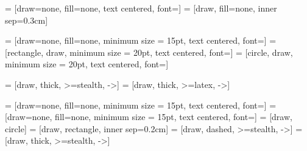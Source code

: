  = [draw=none, fill=none, text centered, font=\normalsize]
 = [draw, fill=none, inner sep=0.3cm]


 = [draw=none, fill=none, minimum size = 15pt, text centered, font=\normalsize]
 = [rectangle, draw, minimum size = 20pt, text centered, font=\normalsize]
 = [circle, draw, minimum size = 20pt, text centered, font=\normalsize]

  = [draw, thick, >=stealth, ->]
  = [draw, thick, >=latex, ->]

 = [draw=none, fill=none, minimum size = 15pt, text centered, font=\normalsize]
 = [draw=none, fill=none, minimum size = 15pt, text centered, font=\normalsize]
 = [draw, circle]
 = [draw, rectangle, inner sep=0.2cm]
  = [draw, dashed, >=stealth, ->]
  = [draw, thick, >=stealth, ->]
